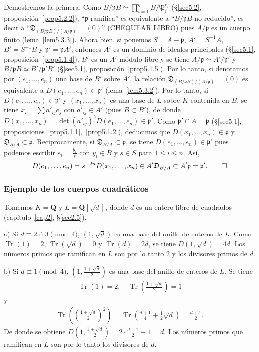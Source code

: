 \documentclass[bibtotoc,leqno,spanish]{amsbook}
\newcommand{\QQ}{\mathbf{Q}}
\newcommand{\idl}[1]{\mathfrak{#1}}
\newcommand{\disc}{\mathfrak{D}}
\DeclareMathOperator{\Tr}{Tr}
\numberwithin{equation}{section}
\theoremstyle{note}
\theoremstyle{note}
\theoremstyle{rem}
\numberwithin{theorem}{section}
\numberwithin{proposition}{section}
\numberwithin{definition}{section}
\numberwithin{lemma}{section}
\numberwithin{corollary}{section}
\numberwithin{example}{section}
\numberwithin{footnote}{section}%
\begin{document}
Demostremos la primera. Como $B/\idl{p}B\simeq\prod_{i=1}^{q}B/\idl{P}_{i}^{e_{i}}$ (\S\ref{sec5.2}, proposici\'on~\ref{prop5.2.2}),
``$\idl{p}$ ramifica'' es equivalente a ``$B/\idl{p}B$ no reducido'', es decir a
``$\disc_{(B/\idl{p}B)/(A/\idl{p})}=(0)$'' (CHEQUEAR LIBRO) pues $A/\idl{p}$ es un cuerpo finito (lema~\ref{lem5.3.3}). Ahora bien,
si ponemos $S = A-\idl{p}$, $A' = S^{-1}A$, $B' =S^{-1}B$ y $\idl{p}' = \idl{p}A'$, entonces
$A'$ es un dominio de ideales principales (\S\ref{sec5.1}, proposici\'on~\ref{prop5.1.4}),
$B'$ es un $A'$-m\'odulo libre y se
tiene $A/\idl{p}\simeq A'/\idl{p}'$ y $B/\idl{p}B\simeq B'/\idl{p}'B'$
(\S\ref{sec5.1}, proposici\'on~\ref{prop5.1.5}). Por lo tanto, si denotamos por $(e_{1},\dots,e_{n})$ una base de $B'$ sobre $A'$, la
relaci\'on $\disc_{(B/\idl{p}B)/(A/\idl{p})}=(0)$ es equivalente a $D(e_{1},\dots,e_{n})\in\idl{p}'$
(lema~\ref{lem5.3.2}). Por lo tanto, si $D(e_{1},\dots,e_{n})\in\idl{p}'$ y $(x_{1},\dots,x_{n})$ es una base de $L$
sobre $K$ contenida en $B$, se tiene $x_{i} = \sum a'_{ij}e_{j}$ con $a'_{ij}\in A'$
(pues $B\subset B'$), de donde $D(x_{1},\dots,x_{n})=\det(a'_{ij})^{2}D(e_{1},\dots,e_{n})\in\idl{p}'$.
Como $\idl{p}'\cap A = \idl{p}$ (\S\ref{sec5.1}, proposiciones~\ref{prop5.1.1},~\ref{prop5.1.2}),
deducimos que $D(x_{1},\dots,x_{n})\in\idl{p}$ y
$\disc_{B/A}\subset\idl{p}$. Reciprocamente, si $\disc_{B/A}\subset\idl{p}$, se tiene
$D(e_{1},\dots,e_{n})\in\idl{p}'$ pues podemos escribir $e_{i}=\frac{y_{i}}{s}$ con $y_{i}\in B$
y $s\in S$ para $1\leq i\leq n$. As\'i,
\begin{gather*}
D(e_{1},\dots,e_{n}) = s^{-2n}D(x_{1},\dots,x_{n})\in A'\disc_{B/A}\subset A'\idl{p}=\idl{p}'.\qedhere
\end{gather*}

\subsubsection*{Ejemplo de los cuerpos cuadr\'aticos}

Tomemos $K = \QQ$ y $L = \QQ[\sqrt{d}]$, donde $d$ es un entero libre de cuadrados (cap\'itulo~\ref{cap2},
\S\ref{sec2.5}).

a) Si $d\equiv 2\text{ \'o }3\pmod 4$, $(1,\sqrt{d})$ es una base del anillo de enteros de $L$. Como
$\Tr(1) = 2$, $\Tr(\sqrt{d}) = 0$ y $\Tr(d) = 2d$, se tiene $D(1,\sqrt{d}) = 4d$. Los n\'umeros primos
que ramifican en $L$ son por lo tanto $2$ y los divisores primos de $d$.

b) Si $d\equiv 1\pmod 4$, $\left(1,\frac{1+\sqrt{d}}{2}\right)$ es una base del anillo de enteros de $L$.
Se tiene
\begin{gather*}
\Tr(1) = 2,\quad\Tr\left(\frac{1+\sqrt{d}}{2}\right) = 1
\end{gather*}
y
\begin{gather*}
\Tr\left(\left(\frac{1+\sqrt{d}}{2}\right)^{2}\right) = \Tr\left(\frac{d+1}{4}+\frac{1}{2}\sqrt{d}\right)=\frac{d+1}{2}.
\end{gather*}
De donde se obtiene $D\left(1,\frac{1+\sqrt{d}}{2}\right) = 2\cdot\frac{d+1}{2}-1 = d$. Los n\'umeros primos
que ramifican en $L$ son por lo tanto los divisores de $d$.
\end{document}
